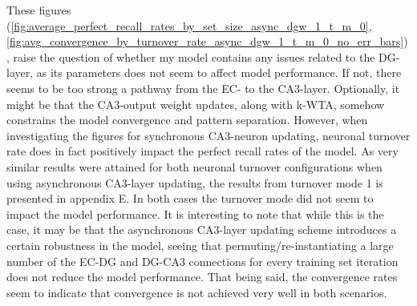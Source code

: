 
These figures (\ref{fig:average_perfect_recall_rates_by_set_size_async_dgw_1_t_m_0}, \ref{fig:avg_convergence_by_turnover_rate_async_dgw_1_t_m_0_no_err_bars}), raise the question of whether my model contains any issues related to the DG-layer, as its parameters does not seem to affect model performance. If not, there seems to be too strong a pathway from the EC- to the CA3-layer. Optionally, it might be that the CA3-output weight updates, along with k-WTA, somehow constrains the model convergence and pattern separation. However, when investigating the figures for synchronous CA3-neuron updating, neuronal turnover rate does in fact positively impact the perfect recall rates of the model. As very similar results were attained for both neuronal turnover configurations when using asynchronous CA3-layer updating, the results from turnover mode 1 is presented in appendix E. 
In both cases the turnover mode did not seem to impact the model performance. It is interesting to note that while this is the case, it may be that the asynchronous CA3-layer updating scheme introduces a certain robustness in the model, seeing that permuting/re-instantiating a large number of the EC-DG and DG-CA3 connections for every training set iteration does not reduce the model performance. That being said, the convergence rates seem to indicate that convergence is not achieved very well in both scenarios.


